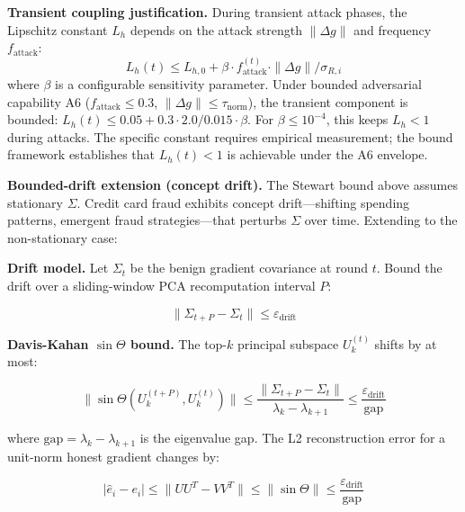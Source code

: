 \documentclass[10pt,journal]{IEEEtran}
\begin{document}
\textbf{Transient coupling justification.} During transient attack phases, the Lipschitz constant $L_h$ depends on the attack strength $\|\Delta g\|$ and frequency $f_{\text{attack}}$:
\begin{equation}
L_h(t) \le L_{h,0} + \beta \cdot f_{\text{attack}}^{(t)} \cdot \|\Delta g\| / \sigma_{R,i}
\label{eq:lh-transient}
\end{equation}
where $\beta$ is a configurable sensitivity parameter. Under bounded adversarial capability A6 ($f_{\text{attack}} \le 0.3$, $\|\Delta g\| \le \tau_{\text{norm}}$), the transient component is bounded: $L_h(t) \le 0.05 + 0.3 \cdot 2.0 / 0.015 \cdot \beta$. For $\beta \le 10^{-4}$, this keeps $L_h < 1$ during attacks. The specific constant requires empirical measurement; the bound framework establishes that $L_h(t) < 1$ is achievable under the A6 envelope.

\textbf{Bounded-drift extension (concept drift).} The Stewart bound above assumes stationary $\Sigma$. Credit card fraud exhibits concept drift---shifting spending patterns, emergent fraud strategies---that perturbs $\Sigma$ over time. Extending to the non-stationary case:

\textbf{Drift model.} Let $\Sigma_t$ be the benign gradient covariance at round $t$. Bound the drift over a sliding-window PCA recomputation interval $P$:

\begin{equation}
\|\Sigma_{t+P} - \Sigma_t\| \le \varepsilon_{\text{drift}}
\label{eq:drift-bound}
\end{equation}

\textbf{Davis-Kahan $\sin\Theta$ bound.} The top-$k$ principal subspace $U_k^{(t)}$ shifts by at most:

\begin{equation}
\|\sin\Theta(U_k^{(t+P)}, U_k^{(t)})\| \le \frac{\|\Sigma_{t+P} - \Sigma_t\|}{\lambda_k - \lambda_{k+1}} \le \frac{\varepsilon_{\text{drift}}}{\text{gap}}
\label{eq:sin-theta-bound}
\end{equation}

where $\text{gap} = \lambda_k - \lambda_{k+1}$ is the eigenvalue gap. The L2 reconstruction error for a unit-norm honest gradient changes by:

\begin{equation}
|\hat{e}_i - e_i| \le \|UU^T - VV^T\| \le \|\sin\Theta\| \le \frac{\varepsilon_{\text{drift}}}{\text{gap}}
\label{eq:drift-error}
\end{equation}
\end{document}
